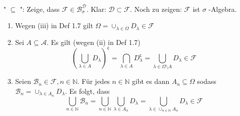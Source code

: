 \documentclass[11.5 pt, a4paper]{memoir}
\begin{document}
	" \underline{$ \subseteq $} ": Zeige, dass $ \mathcal{F} \in \mathcal{B}^{ \mathcal{D}}_{\sigma}  $. Klar: $ \mathcal{D} \subset 
	\mathcal{F}$. Noch zu zeigen: $ \mathcal{F} $ ist $ \sigma $ -Algebra.
	\begin{enumerate}[label=\alph*)]
		\item Wegen (iii) in Def 1.7 gilt $ \Omega  = \cup_{\lambda \in \Omega } D_{\lambda} \in \mathcal{F} $ 
		\item Sei $ A \subseteq \mathcal{A} $. Es gilt (wegen (ii) in Def 1.7)
			$$ \left( \bigcup_{\lambda \in A} D_{\lambda} \right)^{\mathsf{c}} = \bigcap_{\lambda \in A}D_{\lambda}^{\mathsf{c}} = 
			\bigcup_{\lambda \in \Omega \setminus A} D_{\lambda} \in \mathcal{F} $$
		\item Seien $ \mathcal{B}_{n} \in \mathcal{F}, n \in \mathbb{N} $. Für jedes $ n \in \mathbb{N} $  gibt es dann $ A_n \subseteq \Omega  $ sodass $ \mathcal{B}_{n}
			= \cup_{\lambda \in A_n} D_{\lambda}$. Es folgt, dass 
			$$ \bigcup_{n \in \mathbb{N}} \mathcal{B}_{n} = \bigcup_{n \in \mathbb{N}} \bigcup_{\lambda \in A_n} D_{\lambda} = \bigcup_{\lambda \in \cup_{n \in \mathbb{N}}A_n} D_{\lambda} \in \mathcal{F} $$
			
			
	\end{enumerate}
	
\end{document}
